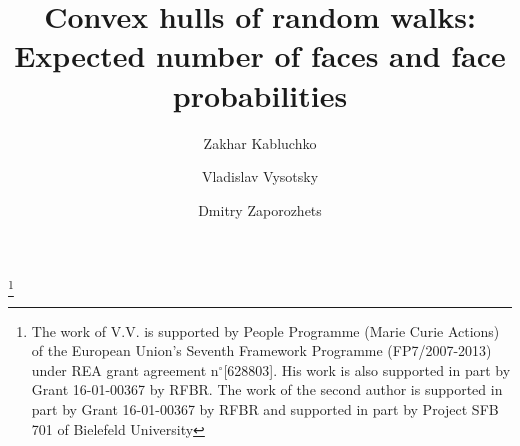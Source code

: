 \documentclass[12pt, reqno]{amsart}
\theoremstyle{plain}
\theoremstyle{definition}
\theoremstyle{remark}
\begin{document}
\author{Zakhar Kabluchko}
\address{Zakhar Kabluchko: Institut f\"ur Mathematische Statistik,
Universit\"at M\"unster,
Orl\'eans--Ring 10,
48149 M\"unster, Germany}

\author{Vladislav Vysotsky}
\address{Vladislav Vysotsky:  Imperial College London, St.\ Petersburg Department of Steklov Mathematical Institute}

\author{Dmitry Zaporozhets}
\address{Dmitry Zaporozhets: St.\ Petersburg Department of Steklov Mathematical Institute,
Fontanka~27,
191011 St.\ Petersburg,
Russia}

\title[Convex hulls of random walks]{Convex hulls of random walks: Expected number of faces and face probabilities}
\thanks{The work of V.V. is supported by People Programme (Marie Curie Actions) of the European Union's Seventh Framework Programme (FP7/2007-2013) under REA grant agreement n$^\circ$[628803]. His work is also supported in part by Grant 16-01-00367 by RFBR. The work of the second author is supported in part by Grant 16-01-00367 by RFBR and supported in part by Project SFB 701 of Bielefeld University}

\end{document}
